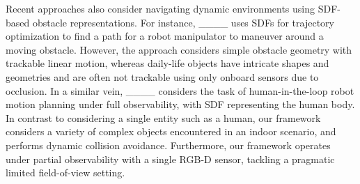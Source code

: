 Recent approaches also consider navigating dynamic environments using SDF-based obstacle representations.
For instance, ____ uses SDFs for trajectory optimization to find a path for a robot manipulator to maneuver around a moving obstacle.
However, the approach considers simple obstacle geometry with trackable linear motion, whereas daily-life objects have intricate shapes and geometries and are often not trackable using only onboard sensors due to occlusion.
In a similar vein, ____ considers the task of human-in-the-loop robot motion planning under full observability, with SDF representing the human body.
In contrast to considering a single entity such as a human, our framework considers a variety of complex objects encountered in an indoor scenario, and performs dynamic collision avoidance.
Furthermore, our framework operates under partial observability with a single RGB-D sensor, tackling a pragmatic limited field-of-view setting.
